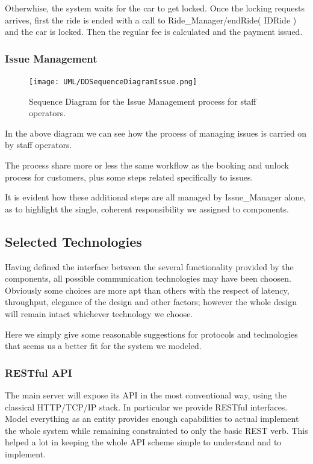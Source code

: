 \documentclass[11pt]{article} %
\begin{document}
Otherwhise, the system waits for the car to get locked. Once the locking requests arrives, first the ride is ended with a call to Ride\_Manager/endRide( IDRide ) and the car is locked. Then the regular fee is calculated and the payment issued.


\subsubsection{Issue Management}
\begin{figure}[H]
	\centering
	\texttt{[image: UML/DDSequenceDiagramIssue.png]}
	\caption{Sequence Diagram for the Issue Management process for staff operators.}
\end{figure}

In the above diagram we can see how the process of managing issues is carried on by staff operators.

The process share more or less the same workflow as the booking and unlock process for customers, plus some steps related specifically to issues.

It is evident how these additional steps are all managed by Issue\_Manager alone, as to highlight the single, coherent responsibility we assigned to components.






\subsection{Selected Technologies}

Having defined the interface between the several functionality provided by the components, all possible communication technologies may have been choosen. Obviously some choices are more apt than others with the respect of latency, throughput, elegance of the design and other factors; however the whole design will remain intact whichever technology we choose.

Here we simply give some reasonable suggestions for protocols and technologies that seems us a better fit for the system we modeled.

\subsubsection{RESTful API}

The main server will expose its API in the most conventional way, using the classical HTTP/TCP/IP stack. In particular we provide RESTful interfaces. Model everything as an entity provides enough capabilities to actual implement the whole system while remaining constrainted to only the basic REST verb. This helped a lot in keeping the whole API scheme simple to understand and to implement.
\end{document}
